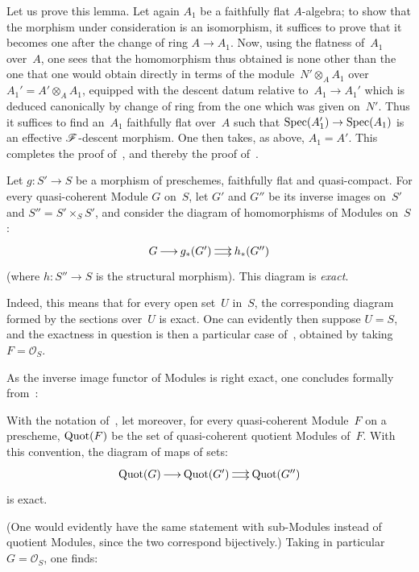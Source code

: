 Let us prove this lemma. Let again $A_{1}$ be a faithfully flat
$A$-algebra; to show that the morphism under consideration is
an isomorphism, it suffices to prove that it becomes one after the
change of ring
$A\to A_1$.
Now, using the flatness of~$A_{1}$ over~$A$, one sees that
the homomorphism thus obtained is none other than the one that one would obtain
directly in terms of the module~$N'\otimes_{A}A_{1}$ over~$A_{1}'=A'\otimes_{A}A_{1}$, equipped with the descent datum
relative to~$A_{1}\to A_{1}'$ which is deduced canonically
by change of ring from the one which was given
on~$N'$. Thus it suffices to find an~$A_{1}$ faithfully flat
over~$A$ such that $\Spec(A_{1}')\to \Spec(A_{1})$ is an
effective $\cal{F}$-descent morphism. One then takes, as above,
$A_{1}=A'$. This completes the proof of~, and
thereby the proof of~.

\begin{corollary}
\label{VIII.1.7}
Let $g\colon S'\to S$ be a morphism of preschemes,
faithfully flat and quasi-compact. For every
quasi-coherent Module $G$ on~$S$, let $G'$ and $G''$ be its inverse
images on~$S'$ and $S''=S'\times_{S}S'$, and consider the
diagram of homomorphisms of Modules on~$S$:
$$
\xymatrix@C=.5cm{G\ar[r] & g_*(G')\ar@<2pt>[r]\ar@<-2pt>[r] & h_*(G'')}
$$
(where $h\colon S''\to S$ is the structural morphism). This diagram
is \emph{exact}.
\end{corollary}

Indeed,
this means that for every open set~$U$ in~$S$, the
corresponding diagram formed by the sections over~$U$ is exact. One can
evidently then suppose $U=S$, and the exactness in question is
then a particular case of~, obtained by taking
$F=\mathcal{O}_{S}$.

As the inverse image functor of Modules is right exact, one
concludes formally from~:

\begin{corollary}
\label{VIII.1.8}
With the notation of~, let moreover, for every
quasi-coherent Module~$F$ on a prescheme, $\operatorname{Quot}(F)$ be the set
of quasi-coherent quotient Modules of~$F$. With this
convention, the diagram of maps of sets:
$$
\xymatrix@C=.5cm{\Quot(G)\ar[r] & \Quot(G')\ar@<2pt>[r]\ar@<-2pt>[r] &
\Quot(G'')}
$$
is exact.
\end{corollary}

(One would evidently have the same statement with
sub-Modules instead of quotient Modules, since the two
correspond bijectively.) Taking in particular
$G=\mathcal{O}_{S}$, one finds:

